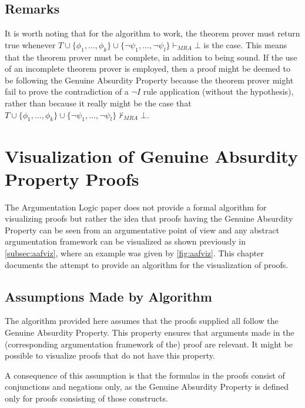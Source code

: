 \documentclass[11pt,twoside,a4paper]{report}
\begin{document}
\section{Remarks}
It is worth noting that for the algorithm to work, the theorem prover must return true whenever $T\cup\{\phi_1, ..., \phi_k\}\cup\{\neg\psi_1, ..., \neg\psi_l\}\vdash_{MRA}\bot$ is the case. This means that the theorem prover must be complete, in addition to being sound. If the use of an incomplete theorem prover is employed, then a proof might be deemed to be following the Genuine Absurdity Property because the theorem prover might fail to prove the contradiction of a $\neg I$ rule application (without the hypothesis), rather than because it really might be the case that $T\cup\{\phi_1, ..., \phi_k\}\cup\{\neg\psi_1, ..., \neg\psi_l\}\nvdash_{MRA}\bot$. 

\chapter{Visualization of Genuine Absurdity Property Proofs}
\label{chap:viz}
The Argumentation Logic paper does not provide a formal algorithm for visualizing proofs but rather the idea that proofs having the Genuine Absurdity Property can be seen from an argumentative point of view and any abstract argumentation framework can be visualized as shown previously in \autoref{subsec:aafviz}, where an example was given by \autoref{fig:aafviz}. This chapter documents the attempt to provide an algorithm for the visualization of proofs.

\section{Assumptions Made by Algorithm}
The algorithm provided here assumes that the proofs supplied all follow the Genuine Absurdity Property. This property ensures that arguments made in the (corresponding argumentation framework of the) proof are relevant. It might be possible to visualize proofs that do not have this property.

A consequence of this assumption is that the formulas in the proofs consist of conjunctions and negations only, as the Genuine Absurdity Property is defined only for proofs consisting of those constructs.
\end{document}
